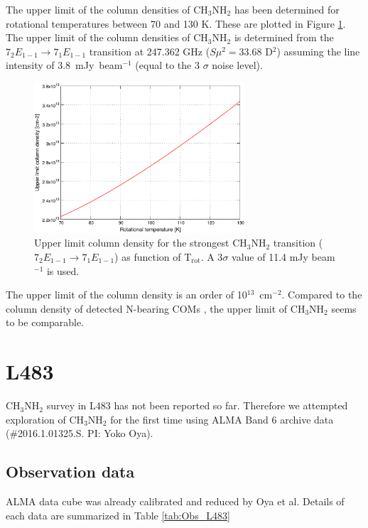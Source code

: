 The upper limit of the column densities of CH$_{3}$NH$_{2}$ has been
determined for rotational temperatures between 70 and 130 K.
These are plotted in Figure \ref{IRAS16293_MA}.
The upper limit of the column densities of CH$_{3}$NH$_{2}$ is determined from the
$7_{2}E_{1-1} \rightarrow 7_{1}E_{1-1}$ transition at 247.362 GHz ($S\mu^2 = 33.68$ D$^2$) assuming the line intensity  of 3.8~mJy~beam$^{-1}$  (equal to the 3 $\sigma$ noise level).

\begin{figure}[htp]
  \centering
  \includegraphics[width=0.7\textwidth]{LMSFR/IRAS16293.eps}
  \caption{Upper limit column density for the strongest CH$_{3}$NH$_{2}$ transition
  ($7_{2}E_{1-1} \rightarrow 7_{1}E_{1-1}$) as function of T$_{\textrm{rot}}$. A 3$\sigma$ value of 
  11.4 mJy beam$^{-1}$ is used.}
  \label{IRAS16293_MA}
\end{figure}

The upper limit of the column density is an order of 10$^{13}$~cm$^{-2}$.
Compared to the column density of detected N-bearing COMs 
\citep[e.g., 4.4$^{+3.0}_{-1.9}$ $\times$ 10$^{14}$ cm$^{-2}$ for NH$_2$CHO,][]{Kahane+2013}, 
the upper limit of CH$_{3}$NH$_{2}$ seems to be comparable.


\section{L483}
CH$_{3}$NH$_{2}$ survey in L483 has not been reported so far.
Therefore we attempted exploration of CH$_{3}$NH$_{2}$ for the first time using ALMA Band 6 archive data (\#2016.1.01325.S. PI: Yoko Oya).

\subsection{Observation data}
ALMA data cube was already calibrated and reduced by Oya et al. 
Details of each data are summarized in Table \ref{tab:Obs_L483}

